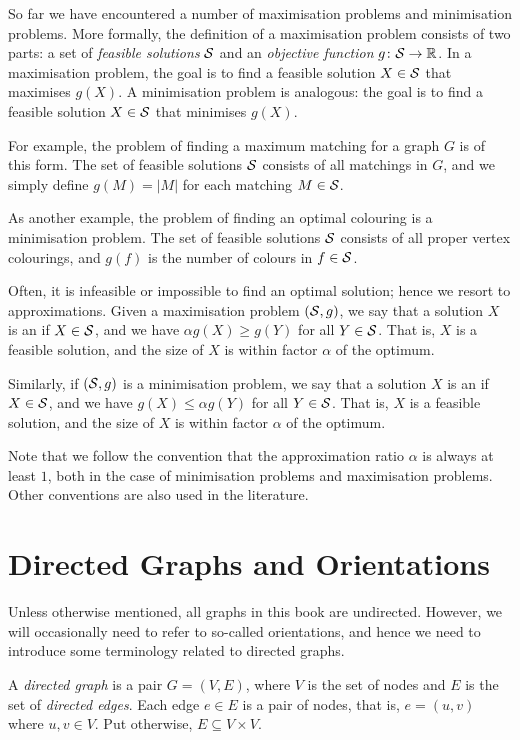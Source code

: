 So far we have encountered a number of maximisation problems and minimisation problems. More formally, the definition of a maximisation problem consists of two parts: a set of \emph{feasible solutions} $\mathcal{S}$ and an \emph{objective function} $g\colon \mathcal{S} \to \mathbb{R}$. In a maximisation problem, the goal is to find a feasible solution $X \in \mathcal{S}$ that maximises $g(X)$. A minimisation problem is analogous: the goal is to find a feasible solution $X \in \mathcal{S}$ that minimises $g(X)$.

For example, the problem of finding a maximum matching for a graph $G$ is of this form. The set of feasible solutions $\mathcal{S}$ consists of all matchings in $G$, and we simply define $g(M) = |M|$ for each matching $M \in \mathcal{S}$.

As another example, the problem of finding an optimal colouring is a minimisation problem. The set of feasible solutions $\mathcal{S}$ consists of all proper vertex colourings, and $g(f)$ is the number of colours in $f \in \mathcal{S}$.

Often, it is infeasible or impossible to find an optimal solution; hence we resort to approximations. Given a maximisation problem $(\mathcal{S},g)$, we say that a solution $X$ is an \emph{\Apx{\alpha}} if $X \in \mathcal{S}$, and we have $\alpha g(X) \ge g(Y)$ for all $Y \in \mathcal{S}$. That is, $X$ is a feasible solution, and the size of $X$ is within factor $\alpha$ of the optimum.

Similarly, if $(\mathcal{S},g)$ is a minimisation problem, we say that a solution $X$ is an \Apx{\alpha} if $X \in \mathcal{S}$, and we have $g(X) \le \alpha g(Y)$ for all $Y \in \mathcal{S}$. That is, $X$ is a feasible solution, and the size of $X$ is within factor $\alpha$ of the optimum.

Note that we follow the convention that the approximation ratio $\alpha$ is always at least $1$, both in the case of minimisation problems and maximisation problems. Other conventions are also used in the literature.


\section{Directed Graphs and Orientations}

Unless otherwise mentioned, all graphs in this book are undirected. However, we will occasionally need to refer to so-called orientations, and hence we need to introduce some terminology related to directed graphs.

A \emph{directed graph} is a pair $G = (V,E)$, where $V$ is the set of nodes and $E$ is the set of \emph{directed edges}. Each edge $e \in E$ is a pair of nodes, that is, $e = (u,v)$ where $u, v \in V$. Put otherwise, $E \subseteq V \times V$.

